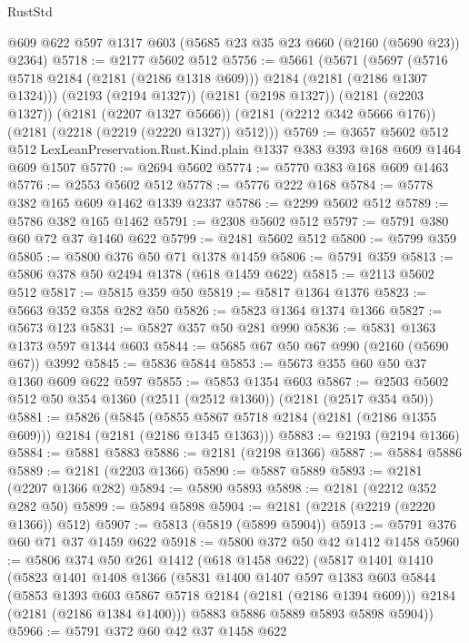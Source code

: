 \begin{lexlean}{RustStd}
\begin{coremodule}
    @609
    @622
    @597
    @1317
    @603
    (@5685 @23 @35 @23 @660 (@2160 (@5690 @23)) @2364)
@5718 := @2177 @5602 @512
@5756 := @5661
    (@5671
      (@5697 (@5716 @5718 @2184 (@2181 (@2186 @1318 @609))) @2184 (@2181 (@2186 @1307 @1324)))
      (@2193 (@2194 @1327))
      (@2181 (@2198 @1327))
      (@2181 (@2203 @1327))
      (@2181 (@2207 @1327 @5666))
      (@2181 (@2212 @342 @5666 @176))
      (@2181 (@2218 (@2219 (@2220 @1327)) @512)))
@5769 := @3657
    @5602
    @512
    @512
    LexLeanPreservation.Rust.Kind.plain
    @1337
    @383
    @393
    @168
    @609
    @1464
    @609
    @1507
@5770 := @2694 @5602
@5774 := @5770 @383 @168 @609 @1463
@5776 := @2553 @5602 @512
@5778 := @5776 @222 @168
@5784 := @5778 @382 @165 @609 @1462 @1339 @2337
@5786 := @2299 @5602 @512
@5789 := @5786 @382 @165 @1462
@5791 := @2308 @5602 @512
@5797 := @5791 @380 @60 @72 @37 @1460 @622
@5799 := @2481 @5602 @512
@5800 := @5799 @359
@5805 := @5800 @376 @50 @71 @1378 @1459
@5806 := @5791 @359
@5813 := @5806 @378 @50 @2494 @1378 (@618 @1459 @622)
@5815 := @2113 @5602 @512
@5817 := @5815 @359 @50
@5819 := @5817 @1364 @1376
@5823 := @5663 @352 @358 @282 @50
@5826 := @5823 @1364 @1374 @1366
@5827 := @5673 @123
@5831 := @5827 @357 @50 @281 @990
@5836 := @5831 @1363 @1373 @597 @1344 @603
@5844 := @5685 @67 @50 @67 @990 (@2160 (@5690 @67)) @3992
@5845 := @5836 @5844
@5853 := @5673 @355 @60 @50 @37 @1360 @609 @622 @597
@5855 := @5853 @1354 @603
@5867 := @2503 @5602 @512 @50 @354 @1360 (@2511 (@2512 @1360)) (@2181 (@2517 @354 @50))
@5881 := @5826
    (@5845 (@5855 @5867 @5718 @2184 (@2181 (@2186 @1355 @609))) @2184 (@2181 (@2186 @1345 @1363)))
@5883 := @2193 (@2194 @1366)
@5884 := @5881 @5883
@5886 := @2181 (@2198 @1366)
@5887 := @5884 @5886
@5889 := @2181 (@2203 @1366)
@5890 := @5887 @5889
@5893 := @2181 (@2207 @1366 @282)
@5894 := @5890 @5893
@5898 := @2181 (@2212 @352 @282 @50)
@5899 := @5894 @5898
@5904 := @2181 (@2218 (@2219 (@2220 @1366)) @512)
@5907 := @5813 (@5819 (@5899 @5904))
@5913 := @5791 @376 @60 @71 @37 @1459 @622
@5918 := @5800 @372 @50 @42 @1412 @1458
@5960 := @5806
    @374
    @50
    @261
    @1412
    (@618 @1458 @622)
    (@5817
      @1401
      @1410
      (@5823
        @1401
        @1408
        @1366
        (@5831
          @1400
          @1407
          @597
          @1383
          @603
          @5844
          (@5853 @1393 @603 @5867 @5718 @2184 (@2181 (@2186 @1394 @609)))
          @2184
          (@2181 (@2186 @1384 @1400)))
        @5883
        @5886
        @5889
        @5893
        @5898
        @5904))
@5966 := @5791 @372 @60 @42 @37 @1458 @622

\end{coremodule}
\end{lexlean}
